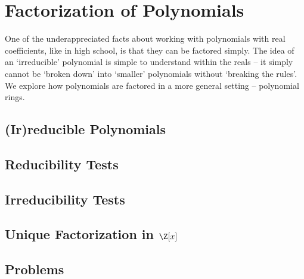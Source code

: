 \chapter{Factorization of Polynomials}
One of the underappreciated facts about working with polynomials with real coefficients, like in high school, is that they can be factored simply. The idea of an `irreducible' polynomial is simple to understand within the reals -- it simply cannot be `broken down' into `smaller' polynomials without `breaking the rules'. We explore how polynomials are factored in a more general setting -- polynomial rings.

\section{(Ir)reducible Polynomials}

\section{Reducibility Tests}

\section{Irreducibility Tests}

\section{Unique Factorization in $\Z[x]$}

\newpage

\section{Problems}
